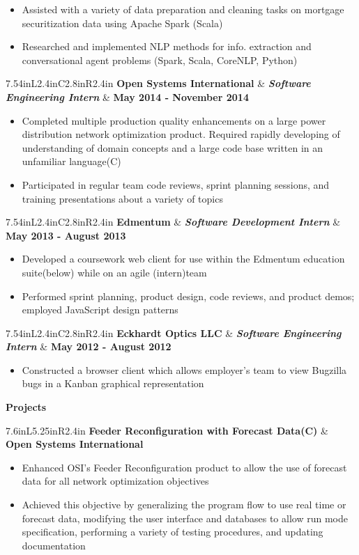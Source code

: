 \documentclass[letterpaper,10pt]{article}
\newcommand{\resitem}[1]{\item #1 

\vspace{-.1in}
}
\newcommand{\resheading}[1]{
	{
		\large\colorbox{mygrey}
		{
			\begin{minipage}{.98\textwidth}

			\centerline{\textbf{#1 \vphantom{p\^{E}}}}
			\end{minipage}
		}
	}
}
\newcommand{\ressubheadingg}[2]{
	\begin{tabular*}{7.6in}{L{5.25in}R{2.4in}}
			\textbf{#1} & \textbf{#2}
	\end{tabular*}
}
\newcommand{\rressubheading}[3]{
	\begin{tabular*}{7.54in}{L{2.4in}C{2.8in}R{2.4in}}
			\textbf{#1} & \textit{\textbf{#2}}  & \textbf{#3}
	\end{tabular*}
}
\begin{document}
			\vspace{-.1in}
			\begin{itemize}
				\resitem{Assisted with a variety of data preparation and cleaning tasks on mortgage securitization data using Apache Spark (Scala)}
				\resitem{Researched and implemented NLP methods for info. extraction and conversational agent problems (Spark, Scala, CoreNLP, Python)}
			\end{itemize}
			\vspace{.1in}
		\rressubheading{Open Systems International}{Software Engineering Intern}{May 2014 - November 2014}
			\vspace{-.1in}
			\begin{itemize}
				\resitem{Completed multiple production quality enhancements on a large power distribution network optimization product. Required rapidly developing of understanding of domain concepts and a large code base written in an unfamiliar language(C)}
				\resitem{Participated in regular team code reviews, sprint planning sessions, and training presentations about a variety of topics}
			\end{itemize}
			\vspace{.1in}
		\rressubheading{Edmentum}{Software Development Intern}{May 2013 - August 2013}
			\vspace{-.1in}
			\begin{itemize}
				\resitem{Developed a coursework web client for use within the Edmentum education suite(below) while on an agile (intern)team}
				\resitem{Performed sprint planning, product design, code reviews, and product demos; employed JavaScript design patterns}
			\end{itemize}
			\vspace{.1in}
			\rressubheading{Eckhardt Optics LLC}{Software Engineering Intern}{May 2012 - August 2012}
			\vspace{-.1in}
			\begin{itemize}
				\resitem{Constructed a browser client which allows employer's team to view Bugzilla bugs in a Kanban graphical representation}
			\end{itemize}
			\vspace{.1in}
	\resheading{Projects}
		\ressubheadingg{Feeder Reconfiguration with Forecast Data(C)}{Open Systems International}
			\vspace{-.25in}
			\begin{itemize}
				\resitem{Enhanced OSI's Feeder Reconfiguration product to allow the use of forecast data for all network optimization objectives}
				\resitem{Achieved this objective by generalizing the program flow to use real time or forecast data, modifying the user interface and databases to allow run mode specification, performing a variety of testing procedures, and updating documentation}
			\end{itemize}
\end{document}
